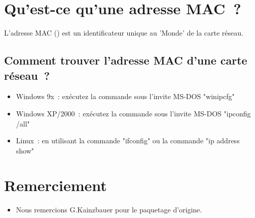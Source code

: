 
\section {Qu'est-ce qu'une adresse MAC~?}

L'adresse MAC () est un
identificateur unique au 'Monde' de la carte réseau.

\subsection{Comment trouver l'adresse MAC d'une carte réseau~?}
\begin{itemize}
  \item Windows 9x~: exécutez la commande sous l'invite MS-DOS "winipcfg"
  \item Windows XP/2000~: exécutez la commande sous l'invite MS-DOS "ipconfig /all"
  \item Linux~: en utilisant la commande "ifconfig" ou la commande "ip address show"
\end{itemize}

\section {Remerciement}
\begin{itemize}
    \item Nous remercions G.Kainzbauer pour le paquetage d'origine.
\end{itemize}
